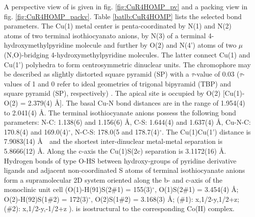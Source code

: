 A perspective view of  is given in fig. \ref{fig:CuR4HOMP_pv} and a packing view in fig. \ref{fig:CuR4HOMP_packv}. Table \ref{batlb:CuR4HOMP} lists the selected bond parameters. The Cu(1) metal center is penta-coordinated by N(1) and N(2) atoms of two terminal isothiocyanato anions, by N(3) of a terminal 4-hydroxymethylpyridine molecule and further by O(2) and N(4’) atoms of two $\mu$ (N,O)-bridging  4-hydroxymethylpyridine molecules. The latter connect Cu(1) and Cu(1’) polyhedra to form centrosymmetric dinuclear units. The  chromophore may be described as slightly distorted square pyramid (SP) with a $\tau$-value of 0.03 ($\tau$-values of 1 and 0 refer to ideal geometries of trigonal bipyramid (TBP) and square pyramid (SP), respectively) \cite{addison}. The apical site is occupied by O(2) [Cu(1)-O(2) = 2.379(4) \AA]. The basal Cu-N bond distances are in the range of 1.954(4) to 2.041(4) \AA. The terminal isothiocyanate anions possess the following bond parameters: N-C: 1.138(6) and 1.156(6) \AA, C-S: 1.644(4) and 1.637(4) \AA, Cu-N-C: 170.8(4) and 169.0(4)$^\circ$, N-C-S: 178.0(5 and 178.7(4)$^\circ$. The Cu(1)\ce{***}Cu(1’) distance is 7.9083(14) \AA \ \ and the shortest inter-dinuclear metal-metal separation is 5.8666(12) \AA. Along the c-axis the Cu(1)\ce{***}S(2c) separation is 3.1172(16) \AA. Hydrogen bonds of type O-H\ce{***}S between hydroxy-groups of pyridine derivative ligands and adjacent non-coordinated S atoms of terminal isothiocyanate anions form a supramolecular 2D system oriented along the b- and c-axis of the monoclinic unit cell (O(1)-H(91)\ce{***}S(2\#1) = 155(3)$^\circ$, O(1)\ce{***}S(2\#1) = 3.454(4) \AA; O(2)-H(92)\ce{***}S(1\#2) = 172(3)$^\circ$, O(2)\ce{***}S(1\#2) = 3.168(3) \AA; (\#1): x,1/2-y,1/2+z; (\#2): x,1/2-y,-1/2+z ).  is isostructural to the corresponding Co(II) complex.


